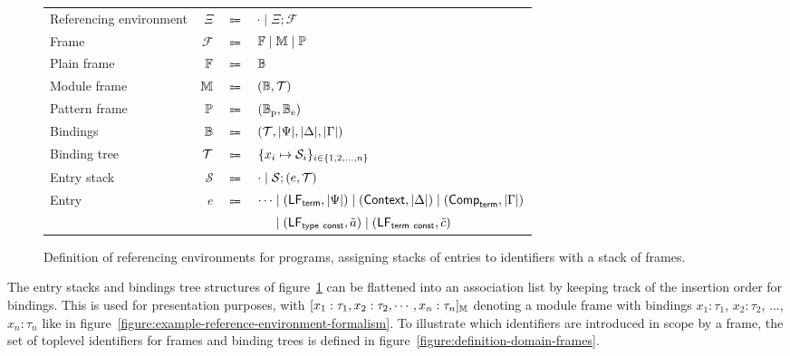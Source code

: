 \begin{figure}[H]
\centering
{\footnotesize
\begin{tabular}{lrcl}
Referencing environment & $\Xi$ & $\Coloneqq$ & $ \cdot \mid \Xi; \mathcal{F} $\\
Frame & $ \mathcal{F} $ & $ \Coloneqq $ & $ \mathbb{F} \mid \mathbb{M} \mid \mathbb{P} $\\
Plain frame & $ \mathbb{F} $ & $ \Coloneqq $ & $ \mathbb{B} $\\
Module frame & $ \mathbb{M} $ & $ \Coloneqq $ & $ (\mathbb{B}, \mathcal{T}) $\\
Pattern frame & $ \mathbb{P} $ & $ \Coloneqq $ & $ (\mathbb{B}_{\text{p}}, \mathbb{B}_{\text{e}}) $\\
Bindings & $ \mathbb{B} $ & $ \Coloneqq $ & $ (\mathcal{T}, |\Psi|, |\Delta|, |\Gamma|) $\\
Binding tree & $ \mathcal{T} $ & $ \Coloneqq $ & $ \{x_i \mapsto \mathcal{S}_i\}_{i \in \{1, 2, \dots, n\}} $\\
Entry stack & $ \mathcal{S} $ & $ \Coloneqq $ & $ \cdot \mid \mathcal{S}; (e, \mathcal{T}) $\\
Entry & $ e $ & $ \Coloneqq $ & $ \cdots \mid (\mathsf{LF}_{\mathsf{term}}, |\Psi|) \mid (\mathsf{Context}, |\Delta|) \mid (\mathsf{Comp}_{\mathsf{term}}, |\Gamma|) $\\
&&& $ \phantom{\cdots} \mid (\mathsf{LF}_{\mathsf{type\ const}}, \tilde a) \mid (\mathsf{LF}_{\mathsf{term\ const}}, \tilde c) $
\end{tabular}
}
\caption[Definition of referencing environments for \Beluga programs]{%
Definition of referencing environments for \Beluga programs, assigning stacks of entries to identifiers with a stack of frames.
}
\label{figure:referencing-environment-definition}
\end{figure}

The entry stacks and bindings tree structures of figure~\ref{figure:referencing-environment-definition} can be flattened into an association list by keeping track of the insertion order for bindings.
This is used for presentation purposes, with $[x_1 : \tau_1, x_2 : \tau_2, \cdots, x_n : \tau_n]_{\mathbb{M}}$ denoting a module frame with bindings $x_1 : \tau_1$, $x_2 : \tau_2$, ..., $x_n : \tau_n$ like in figure~\ref{figure:example-reference-environment-formalism}.
To illustrate which identifiers are introduced in scope by a frame, the set of toplevel identifiers for frames and binding trees is defined in figure~\ref{figure:definition-domain-frames}.

